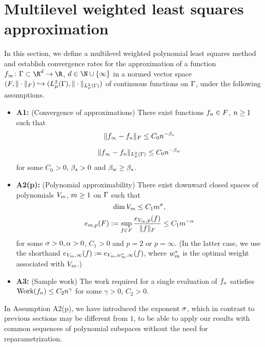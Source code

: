 \section{Multilevel weighted least squares approximation}
\label{sec:nonadaptive}
In this section, we define a multilevel weighted polynomial least squares method and establish convergence rates for the approximation of a function $\rs_{\infty}\colon\domPS\subset\R^d\to\R$, $d\in\N\cup\{\infty\}$ in a normed vector space $(\F,\|\cdot\|_{\F})\hookrightarrow (L^2_{\measure}(\domPS),\norm{\cdot}{L^2_{\measure}(\domPS)})$ of continuous functions on $\domPS$, under the following assumptions.
\begin{itemize}
	\item{\textbf{A1:}} (Convergence of approximations) There exist functions $\rs_\n\in \F$, $\n\geq 1$ such that 
	\begin{equation*}
	\norm{\rs_{\infty}-\rs_\n}{\F}\leq C_0\n^{-\sc}
	\end{equation*} 
 
	\begin{equation*}
	\norm{\rs_{\infty}-\rs_{\n}}{L^2_{\measure}(\domPS)}\leq C_0 \n^{-\wc}
	\end{equation*}
	for some $C_0>0$, $\sc>0$ and $\wc\geq \sc$.
	
\item{\textbf{A2(p):}} (Polynomial approximability) There exist  downward closed spaces of polynomials $\vsp_{\dvsp}$, $\dvsp\geq 1$ on $\domPS$ such that
\begin{equation*}
\dim \vsp_{\dvsp}\leq C_1 \dvsp^{\dimp},
\end{equation*}
	\begin{equation*}
	e_{\dvsp,p}(\F):=\sup_{\rs\in \F} \frac{e_{\vsp_{\dvsp},p}(\rs)}{\norm{\rs}{\F}}\leq C_1\dvsp^{-\alpha}
	\end{equation*}
	for some $\dimp>0, \alpha>0$, $C_1>0$ and $p=2$ or $p=\infty$. (In the latter case, we use the shorthand $e_{\vsp_{\dvsp},\infty}(\rs):=e_{\vsp_{\dvsp},\optimalweight_{\dvsp},\infty}(\rs)$, where $\optimalweight_{\dvsp}$ is the optimal weight associated with $\vsp_{\dvsp}$.)

\item{\textbf{A3:}} (Sample work) The work required for a single evaluation of $\rs_\n$ satisfies $\work(\rs_n)\leq C_2\n^{\gamma}$ for some $\gamma>0$, $C_2>0$. 

\end{itemize}
\begin{rem}
		In Assumption A2(p), we have introduced the exponent $\dimp$, which in contrast to previous sections may be different from $1$, to be able to apply our results with common sequences of polynomial subspaces without the need for reparametrization. 
\end{rem}


